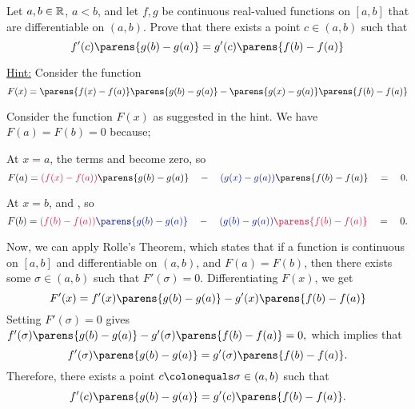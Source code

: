 \begin{problem}
  Let $a, b \in \mathbb{R}$, $a < b$, and let $f, g$ be continuous
  real-valued functions on $[a, b]$ that are differentiable
  on $(a, b)$.
  Prove that there exists a point $c \in (a, b)$ such that
  \[ f'(c) \parens{g(b) - g(a)} = g'(c)\parens{f(b) - f(a)} \]

  \step
  \underline{Hint:} Consider the function
  \[
    F(x) =
      \parens{f(x) - f(a)} \parens{g(b) - g(a)}
      - \parens{g(x) - g(a)} \parens{f(b) - f(a)}  
    \]
\end{problem}


\begin{answer}
  Consider the function $F(x)$ as suggested in the hint.
  We have \( F(a) = F(b) = 0 \) because;
  \begin{enumarabic}
    \item At $x = a$, the terms  and 
      become zero, so
      \[
        F(a) = \crim{(f(x) - f(a))} \parens{g(b) - g(a)}
        \quad - \quad \zaff{(g(x) - g(a))} \parens{f(b) - f(a)}
        \quad = \quad 0.
      \]
    \item At $x = b$, 
      and ,
      so \[
        F(b) = \crim{(f(b) - f(a))} \zaff{\parens{g(b) - g(a)}}
        \quad - \quad \zaff{(g(b) - g(a))} \crim{\parens{f(b) - f(a)}}
        \quad = \quad 0.
      \]
  \end{enumarabic}

  Now, we can apply Rolle's Theorem, which states that if a function is continuous on $[a, b]$
  and differentiable on $(a, b)$, and $F(a) = F(b)$, then there exists
  some $\sigma \in (a, b)$ such that $F'(\sigma) = 0$.
  Differentiating $F(x)$, we get
  \[
    F'(x) = f'(x) \parens{g(b) - g(a)} - g'(x) \parens{f(b) - f(a)}
  \]
  Setting $F'(\sigma) = 0$ gives
  \(
    f'(\sigma) \parens{g(b) - g(a)} - g'(\sigma) \parens{f(b) - f(a)} = 0,
  \)
  which implies that
  \[ f'(\sigma) \parens{g(b) - g(a)} = g'(\sigma) \parens{f(b) - f(a)}. \]
  Therefore, there exists a point $c \colonequals \sigma \in (a, b)$ such that
  \[ f'(c) \parens{g(b) - g(a)} = g'(c)\parens{f(b) - f(a)}. \]
\end{answer}
